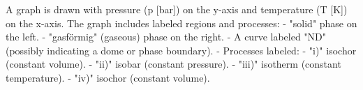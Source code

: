 A graph is drawn with pressure (p [bar]) on the y-axis and temperature (T [K]) on the x-axis. The graph includes labeled regions and processes:  
- "solid" phase on the left.  
- "gasförmig" (gaseous) phase on the right.  
- A curve labeled "ND" (possibly indicating a dome or phase boundary).  
- Processes labeled:  
  - "i)" isochor (constant volume).  
  - "ii)" isobar (constant pressure).  
  - "iii)" isotherm (constant temperature).  
  - "iv)" isochor (constant volume).